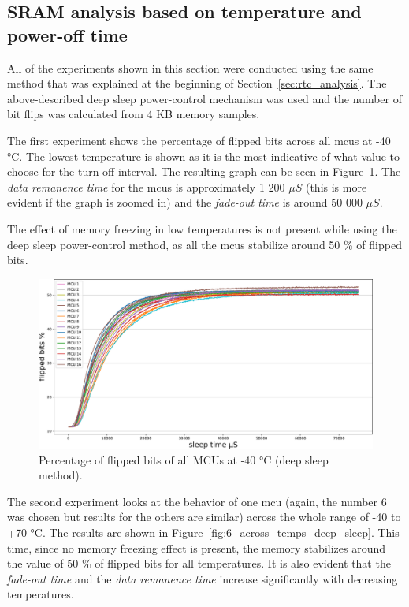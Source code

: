 \subsection{SRAM analysis based on temperature and power-off time}\label{sec:deep_sleep_analysis}

All of the experiments shown in this section were conducted using the same method that was explained at the beginning of Section~\ref{sec:rtc_analysis}. The above-described deep sleep power-control mechanism was used and the number of bit flips was calculated from 4 KB memory samples.

The first experiment shows the percentage of flipped bits across all \glspl{mcu} at -40 °C. The lowest temperature is shown as it is the most indicative of what value to choose for the turn off interval. The resulting graph can be seen in Figure~\ref{fig:all_minus_40_deep_sleep}. The \emph{data remanence time} for the \glspl{mcu} is approximately 1 200 $\mu{}S$ (this is more evident if the graph is zoomed in) and the \emph{fade-out time} is around 50 000 $\mu{}S$.

The effect of memory freezing in low temperatures is not present while using the deep sleep power-control method, as all the \glspl{mcu} stabilize around 50 \% of flipped bits.

\begin{figure}[ht!]
    \centering
    \captionsetup{justification=centering,margin=0.5cm}
    \includegraphics[width=\textwidth]{images/all_minus_40_deep_sleep.png}
    \caption{Percentage of flipped bits of all MCUs at -40 °C (deep sleep method).}
    \label{fig:all_minus_40_deep_sleep}
\end{figure}

The second experiment looks at the behavior of one \gls{mcu} (again, the number 6 was chosen but results for the others are similar) across the whole range of -40 to +70 °C. The results are shown in Figure~\ref{fig:6_across_temps_deep_sleep}. This time, since no memory freezing effect is present, the memory stabilizes around the value of 50 \% of flipped bits for all temperatures. It is also evident that the \emph{fade-out time} and the \emph{data remanence time} increase significantly with decreasing temperatures.

